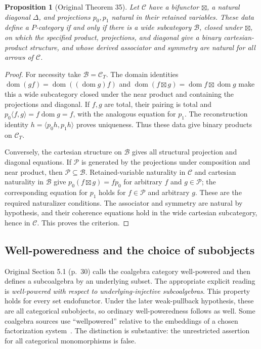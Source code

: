 \documentclass[11pt]{article}
\newtheorem{proposition}[theorem]{Proposition}
\newcommand{\C}{\mathcal C}\newcommand{\D}{\mathcal D}\newcommand{\B}{\mathcal B}
\newcommand{\dom}{\operatorname{dom}}\newcommand{\ran}{\operatorname{ran}}
\begin{document}
\begin{proposition}[Original Theorem 35]
Let $\C$ have a bifunctor $\boxtimes$, a natural diagonal $\Delta$,
and projections $p_0,p_1$ natural in their retained variables. These
data define a $P$-category if and only if there is a wide subcategory
$\B$, closed under $\boxtimes$, on which the specified product,
projections, and diagonal give a binary cartesian-product structure,
and whose derived associator and symmetry are natural for all arrows
of $\C$.
\end{proposition}
\begin{proof}
For necessity take $\B=\C_T$. The domain identities
$\dom(gf)=\dom((\dom g)f)$ and
$\dom(f\boxtimes g)=\dom f\boxtimes\dom g$ make this a wide
subcategory closed under the near product and containing the
projections and diagonal. If $f,g$ are total, their pairing is total
and $p_0\langle f,g\rangle=f\dom g=f$, with the analogous equation
for $p_1$. The reconstruction identity
$h=\langle p_0h,p_1h\rangle$ proves uniqueness. Thus these data give
binary products on $\C_T$.

Conversely, the cartesian structure on $\B$ gives all structural
projection and diagonal equations. If $\mathcal P$ is generated by
the projections under composition and near product, then
$\mathcal P\subseteq\B$. Retained-variable naturality in $\C$ and
cartesian naturality in $\B$ give
$p_0(f\boxtimes g)=f p_0$ for arbitrary $f$ and $g\in\mathcal P$;
the corresponding equation for $p_1$ holds for
$f\in\mathcal P$ and arbitrary $g$. These are the required
naturalizer conditions. The associator and symmetry are natural by
hypothesis, and their coherence equations hold in the wide cartesian
subcategory, hence in $\C$. This proves the criterion.
\end{proof}

\subsection{Well-poweredness and the choice of subobjects}\label{sec:wellpoweredness}
Original Section 5.1 (p.~30) calls the coalgebra category well-powered and then
defines a subcoalgebra by an underlying subset. The appropriate explicit
reading is \emph{well-powered with respect to underlying-injective
subcoalgebras}. This property holds for every set endofunctor. Under the
later weak-pullback hypothesis, these are all categorical subobjects, so
ordinary well-poweredness follows as well. Some coalgebra sources use
``wellpowered'' relative to the embeddings of a chosen factorization
system~\cite{RK}.
The distinction is substantive: the unrestricted assertion for all
categorical monomorphisms is false.
\end{document}
